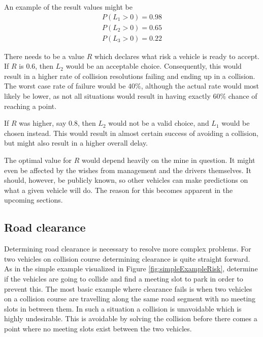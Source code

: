 \documentclass{article}
\begin{document}
			An example of the result values might be
			\begin{equation*}
				\begin{split}
					P(L_1>0)=0.98 \\ P(L_2>0)=0.65 \\ P(L_3>0)=0.22
				\end{split}
			\end{equation*}

			There needs to be a value $R$ which declares what risk a vehicle is ready to accept. If $R$ is $0.6$, then $L_2$ would be an acceptable choice. Consequently, this would result in a higher rate of collision resolutions failing and ending up in a collision. The worst case rate of failure would be $40\%$, although the actual rate would most likely be lower, as not all situations would result in having exactly $60\%$ chance of reaching a point.

			 If $R$ was higher, say $0.8$, then $L_2$ would not be a valid choice, and $L_1$ would be chosen instead. This would result in almost certain success of avoiding a collision, but might also result in a higher overall delay.

			The optimal value for $R$ would depend heavily on the mine in question. It might even be affected by the wishes from management and the drivers themselves. It should, however, be publicly known, so other vehicles can make predictions on what a given vehicle will do. The reason for this becomes apparent in the upcoming sections.

		\subsection{Road clearance}
		\label{sec:RoadClearance}
			Determining road clearance is necessary to resolve more complex problems. For two vehicles on collision course determining clearance is quite straight forward. As in the simple example visualized in Figure \ref{fig:simpleExampleRisk}, determine if the vehicles are going to collide and find a meeting slot to park in order to prevent this. The most basic example where clearance fails is when two vehicles on a collision course are travelling along the same road segment with no meeting slots in between them. In such a situation a collision is unavoidable which is highly undesirable. This is avoidable by solving the collision before there comes a point where no meeting slots exist between the two vehicles.
\end{document}
